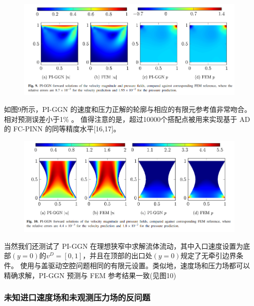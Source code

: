 \begin{figure}[H]  
    \centering  
    \includegraphics[width=\textwidth]{./pics/p9.png}  
\end{figure}

如图9所示，PI-GGN 的速度和压力正解的轮廓与相应的有限元参考值非常吻合。相对预测误差小于1\% 。
值得注意的是，超过10000个搭配点被用来实现基于 AD 的 FC-PINN 的同等精度水平[16,17]。


\begin{figure}[h]  
    \centering  
    \includegraphics[width=\textwidth]{./pics/p10.png}  
\end{figure}

当然我们还测试了 PI-GGN 在理想狭窄中求解流体流动，其中入口速度设置为底部$(y = 0)的 v^D = [0,1]$，并且在顶部的出口处$(y = 0)$规定了无牵引边界条件。
使用与盖驱动空腔问题相同的有限元设置。类似地，速度场和压力场都可以精确求解，PI-GGN 预测与 FEM 参考结果一致(见图10)

\subsubsection{未知进口速度场和未观测压力场的反问题}

